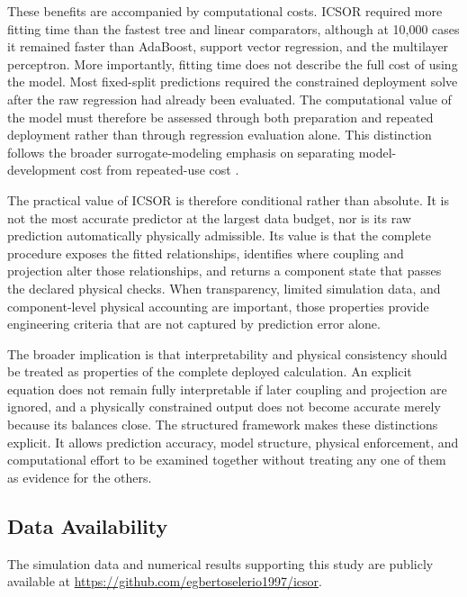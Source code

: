 These benefits are accompanied by computational costs. ICSOR required more fitting time than the fastest tree and linear comparators, although at 10,000 cases it remained faster than AdaBoost, support vector regression, and the multilayer perceptron. More importantly, fitting time does not describe the full cost of using the model. Most fixed-split predictions required the constrained deployment solve after the raw regression had already been evaluated. The computational value of the model must therefore be assessed through both preparation and repeated deployment rather than through regression evaluation alone. This distinction follows the broader surrogate-modeling emphasis on separating model-development cost from repeated-use cost \citep{BhosekarIerapetritou2018,Bliek2023}.

The practical value of ICSOR is therefore conditional rather than absolute. It is not the most accurate predictor at the largest data budget, nor is its raw prediction automatically physically admissible. Its value is that the complete procedure exposes the fitted relationships, identifies where coupling and projection alter those relationships, and returns a component state that passes the declared physical checks. When transparency, limited simulation data, and component-level physical accounting are important, those properties provide engineering criteria that are not captured by prediction error alone.

The broader implication is that interpretability and physical consistency should be treated as properties of the complete deployed calculation. An explicit equation does not remain fully interpretable if later coupling and projection are ignored, and a physically constrained output does not become accurate merely because its balances close. The structured framework makes these distinctions explicit. It allows prediction accuracy, model structure, physical enforcement, and computational effort to be examined together without treating any one of them as evidence for the others.

\subsection{Data Availability}
\label{sec:icsor_data_availability}

The simulation data and numerical results supporting this study are publicly available at \url{https://github.com/egbertoselerio1997/icsor}.